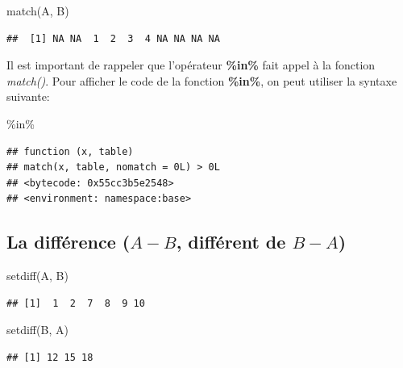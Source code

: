 \documentclass[
]{book}
\newenvironment{Shaded}{\begin{snugshade}}{\end{snugshade}}
\newcommand{\AttributeTok}[1]{\textcolor[rgb]{0.77,0.63,0.00}{#1}}
\newcommand{\FunctionTok}[1]{\textcolor[rgb]{0.00,0.00,0.00}{#1}}
\newcommand{\NormalTok}[1]{#1}
\newcommand{\StringTok}[1]{\textcolor[rgb]{0.31,0.60,0.02}{#1}}
\theoremstyle{definition}
\theoremstyle{definition}
\theoremstyle{definition}
\theoremstyle{definition}
\theoremstyle{remark}
\begin{document}
\begin{Shaded}
\begin{Highlighting}[]
\FunctionTok{match}\NormalTok{(A, B)}
\end{Highlighting}
\end{Shaded}

\begin{verbatim}
##  [1] NA NA  1  2  3  4 NA NA NA NA
\end{verbatim}

Il est important de rappeler que l'opérateur \textbf{\%in\%} fait appel à la fonction \emph{match()}. Pour afficher le code de la fonction \textbf{\%in\%}, on peut utiliser la syntaxe suivante:

\begin{Shaded}
\begin{Highlighting}[]
\StringTok{\textasciigrave{}}\AttributeTok{\%in\%}\StringTok{\textasciigrave{}}
\end{Highlighting}
\end{Shaded}

\begin{verbatim}
## function (x, table) 
## match(x, table, nomatch = 0L) > 0L
## <bytecode: 0x55cc3b5e2548>
## <environment: namespace:base>
\end{verbatim}

\hypertarget{la-diffuxe9rence-a-b-diffuxe9rent-de-b-a}{%
\subsection{\texorpdfstring{La différence (\(A-B\), différent de \(B-A\))}{La différence (A-B, différent de B-A)}}\label{la-diffuxe9rence-a-b-diffuxe9rent-de-b-a}}

\begin{Shaded}
\begin{Highlighting}[]
\FunctionTok{setdiff}\NormalTok{(A, B)}
\end{Highlighting}
\end{Shaded}

\begin{verbatim}
## [1]  1  2  7  8  9 10
\end{verbatim}

\begin{Shaded}
\begin{Highlighting}[]
\FunctionTok{setdiff}\NormalTok{(B, A)}
\end{Highlighting}
\end{Shaded}

\begin{verbatim}
## [1] 12 15 18
\end{verbatim}
\end{document}
